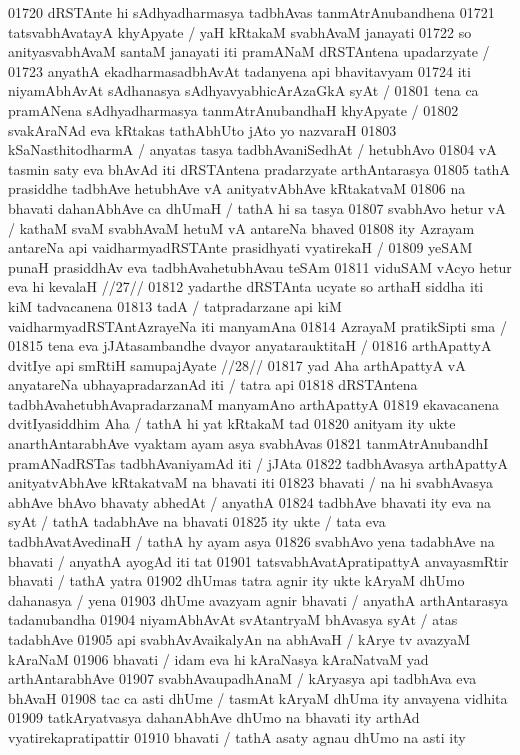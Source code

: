 01720 dRSTAnte hi sAdhyadharmasya tadbhAvas tanmAtrAnubandhena
01721 tatsvabhAvatayA khyApyate / yaH kRtakaM svabhAvaM janayati  
01722 so anityasvabhAvaM santaM janayati iti pramANaM dRSTAntena upadarzyate /
01723 anyathA ekadharmasadbhAvAt tadanyena api bhavitavyam
01724 iti niyamAbhAvAt sAdhanasya sAdhyavyabhicArAzaGkA syAt /  
01801 tena ca pramANena sAdhyadharmasya tanmAtrAnubandhaH khyApyate /
01802 svakAraNAd eva kRtakas tathAbhUto jAto yo nazvaraH
01803 kSaNasthitodharmA / anyatas tasya tadbhAvaniSedhAt /  hetubhAvo  
01804 vA tasmin saty eva bhAvAd iti dRSTAntena pradarzyate arthAntarasya  
01805 tathA prasiddhe tadbhAve hetubhAve vA anityatvAbhAve  kRtakatvaM 
01806 na bhavati dahanAbhAve ca dhUmaH / tathA hi sa tasya  
01807 svabhAvo hetur vA / kathaM svaM svabhAvaM hetuM vA antareNa bhaved 
01808 ity Azrayam antareNa api vaidharmyadRSTAnte prasidhyati vyatirekaH /
01809 yeSAM punaH prasiddhAv eva tadbhAvahetubhAvau teSAm
01811 	viduSAM vAcyo hetur eva hi kevalaH //27//  
01812 yadarthe dRSTAnta ucyate so arthaH siddha iti kiM tadvacanena 
01813 tadA / tatpradarzane api kiM vaidharmyadRSTAntAzrayeNa iti manyamAna
01814 AzrayaM pratikSipti sma /
01815 	tena eva jJAtasambandhe dvayor anyatarauktitaH /
01816 	arthApattyA dvitIye api smRtiH samupajAyate //28//
01817 yad Aha arthApattyA vA anyatareNa ubhayapradarzanAd iti / tatra api 
01818 dRSTAntena tadbhAvahetubhAvapradarzanaM manyamAno arthApattyA
01819 ekavacanena dvitIyasiddhim Aha / tathA hi yat kRtakaM tad
01820 anityam ity ukte anarthAntarabhAve vyaktam ayam asya svabhAvas 
01821 tanmAtrAnubandhI pramANadRSTas tadbhAvaniyamAd iti / jJAta
01822 tadbhAvasya arthApattyA anityatvAbhAve kRtakatvaM na bhavati iti
01823 bhavati / na hi svabhAvasya abhAve bhAvo bhavaty abhedAt /  anyathA  
01824 tadbhAve bhavati ity eva na syAt / tathA tadabhAve na bhavati 
01825 ity ukte / tata eva tadbhAvatAvedinaH / tathA hy ayam asya  
01826 svabhAvo yena tadabhAve na bhavati / anyathA ayogAd iti tat
01901 tatsvabhAvatApratipattyA anvayasmRtir bhavati / tathA yatra  
01902 dhUmas tatra agnir ity ukte kAryaM dhUmo dahanasya / yena  
01903 dhUme avazyam agnir bhavati / anyathA arthAntarasya tadanubandha 
01904 niyamAbhAvAt svAtantryaM bhAvasya syAt / atas tadabhAve 
01905 api svabhAvAvaikalyAn na abhAvaH / kArye tv avazyaM kAraNaM  
01906 bhavati / idam eva hi kAraNasya kAraNatvaM yad arthAntarabhAve
01907 svabhAvaupadhAnaM / kAryasya api tadbhAva eva bhAvaH
01908 tac ca asti dhUme / tasmAt kAryaM dhUma ity anvayena vidhita
01909 tatkAryatvasya dahanAbhAve dhUmo na bhavati ity arthAd vyatirekapratipattir
01910 bhavati / tathA asaty agnau dhUmo na asti ity
